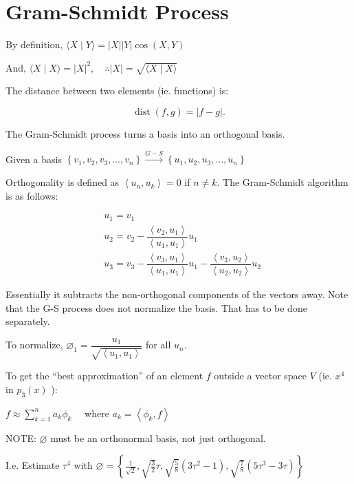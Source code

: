 \documentclass{report}
\begin{document}
\section{Gram-Schmidt Process}

By definition, $\langle X \mid Y\rangle=|X||Y| \cos (X, Y)$

And, $\langle X \mid X\rangle=|X|^{2},\quad \therefore|X|=\sqrt{\langle X \mid X\rangle}$

The distance between two elements (ie. functions) is:

$$
\operatorname{dist}(f, g)=|f-g|.
$$

The Gram-Schmidt process turns a basis into an orthogonal basis.

Given a basis $\left\{v_{1}, v_{2}, v_{3}, \ldots, v_{n}\right\} \xrightarrow{G-S}\left\{u_{1}, u_{2}, u_{3}, \ldots, u_{n}\right\}$

Orthogonality is defined as $\left\langle u_{n}, u_{k}\right\rangle=0$ if $n \neq k$. The Gram-Schmidt algorithm is as follows:

$$
\begin{aligned}
& u_{1}=v_{1} \\
& u_{2}=v_{2}-\dfrac{\left\langle v_{2}, u_{1}\right\rangle}{\left\langle u_{1}, u_{1}\right\rangle} u_{1} \\
& u_{3}=v_{3}-\dfrac{\left\langle v_{3}, u_{1}\right\rangle}{\left\langle u_{1}, u_{1}\right\rangle} u_{1}-\dfrac{\left\langle v_{3}, u_{2}\right\rangle}{\left\langle u_{2}, u_{2}\right\rangle} u_{2}
\end{aligned}
$$

Essentially it subtracts the non-orthogonal components of the vectors away. Note that the G-S process does not normalize the basis. That has to be done separately.

To normalize, $\varnothing_{1}=\dfrac{u_{1}}{\sqrt{\left\langle u_{1}, u_{1}\right\rangle}}$ for all $u_{n}$.

To get the ``best approximation'' of an element $f$ outside a vector space $V$ (ie. $x^{4}$ in $p_{3}(x)$ ):

$f \approx \sum\limits_{k=1}^{n} a_{k} \phi_{k} \quad$ where $a_{k}=\left\langle\phi_{k}, f\right\rangle$

NOTE: $\varnothing$ must be an orthonormal basis, not just orthogonal.

I.e. Estimate $\tau^{4}$ with $\varnothing=\left\{\frac{1}{\sqrt{2}}, \sqrt{\frac{3}{2}} \tau, \sqrt{\frac{5}{8}}\left(3 \tau^{2}-1\right), \sqrt{\frac{7}{8}}\left(5 \tau^{3}-3 \tau\right)\right\}$
\end{document}
